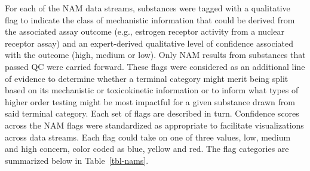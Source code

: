 \documentclass[
  super,
  preprint,
  3p]{elsarticle}
\begin{document}
For each of the NAM data streams, substances were tagged with a
qualitative flag to indicate the class of mechanistic information that
could be derived from the associated assay outcome (e.g., estrogen
receptor activity from a nuclear receptor assay) and an expert-derived
qualitative level of confidence associated with the outcome (high,
medium or low). Only NAM results from substances that passed QC were
carried forward. These flags were considered as an additional line of
evidence to determine whether a terminal category might merit being
split based on its mechanistic or toxicokinetic information or to inform
what types of higher order testing might be most impactful for a given
substance drawn from said terminal category. Each set of flags are
described in turn. Confidence scores across the NAM flags were
standardized as appropriate to facilitate visualizations across data
streams. Each flag could take on one of three values, low, medium and
high concern, color coded as blue, yellow and red. The flag categories
are summarized below in Table~\ref{tbl-nams}.
\end{document}
